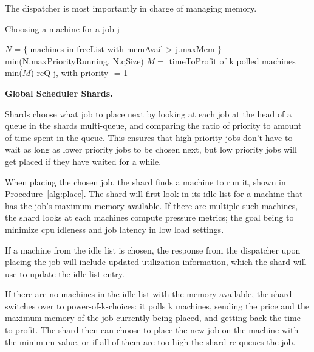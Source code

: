 The dispatcher is most importantly in charge of managing memory. 

\makeatletter
\renewcommand{\ALG@name}{Procedure}
\makeatother
\begin{algorithm}[t]
\caption{Choosing a machine for a job j}\label{alg:place}
\begin{algorithmic}
    \State$N = \{ $ machines in freeList with memAvail > j.maxMem $\}$
     \\
        \Return$ $min(N.maxPriorityRunning, N.qSize)
    \EndIf
    \State$M = $ timeToProfit of k polled machines
     \\
        \Return$ $min($M$)
    \Else
        \State$ $reQ j, with priority -= 1
    \EndIf
\end{algorithmic}
\end{algorithm}


\textbf{Global Scheduler Shards.}

Shards choose what job to place next by looking at each job at the head of a
queue in the shards multi-queue, and comparing the ratio of priority to amount
of time spent in the queue. This ensures that high priority jobs don't have to
wait as long as lower priority jobs to be chosen next, but low priority jobs
will get placed if they have waited for a while.

When placing the chosen job, the shard finds a machine to run it, shown in
Procedure~\ref{alg:place}. The shard will first look in its idle list for a
machine that has the job's maximum memory available. If there are multiple such
machines, the shard looks at each machines compute pressure metrics; the goal
being to minimize cpu idleness and job latency in low load
settings. 

If a machine from the idle list is chosen, the response from the dispatcher upon
placing the job will include updated utilization information, which the shard
will use to update the idle list entry.

If there are no machines in the idle list with the memory available, the shard
switches over to power-of-k-choices: it polls k machines, sending the price and
the maximum memory of the job currently being placed, and getting back the time
to profit. The shard then can choose to place the new job on the machine with
the minimum value, or if all of them are too high the shard re-queues the job.
